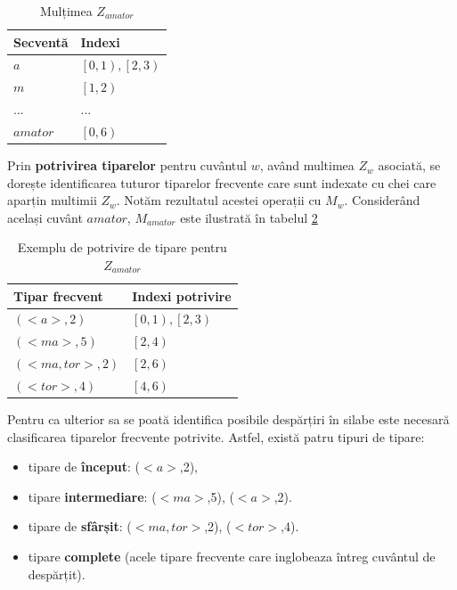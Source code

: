 \begin{table}[h!]
\centering    
\begin{tabular}{|l|l|}    
\hline      
Secventă & Indexi\\
\hline
$a$ 		& $\left[0,1\right), \left[2,3\right)$  \\
$m$ 		& $\left[1,2\right)$  \\
... 		& ...  \\
$amator$ 	& $\left[0,6\right)$  \\

\hline
\end{tabular}
\caption{Mulțimea $Z_{amator}$}
\label{table:sdb_substrings}               
\end{table}  

\begin{defi} Prin \textbf{potrivirea tiparelor} pentru cuvântul $w$, având multimea $Z_w$ asociată, se dorește identificarea tuturor tiparelor frecvente care sunt indexate cu chei care aparțin multimii $Z_w$. Notăm rezultatul acestei operații cu $M_w$. Considerând același cuvânt $amator$, $M_{amator}$ este ilustrată în tabelul \ref{table:sdb_pattern_match}
\end{defi}

\begin{table}[h!]
\centering    
\begin{tabular}{|l|l|}    
\hline      
Tipar frecvent & Indexi potrivire\\
\hline
$(<a>, 2)$			& $\left[0,1\right), \left[2,3\right)$   \\
$(<ma>, 5)$  		& $\left[2,4\right)$\\
$(<ma, tor>, 2)$ 	& $\left[2,6\right)$ \\
$(<tor>, 4)$  		& $\left[4,6\right)$\\
\hline
\end{tabular}
\caption{Exemplu de potrivire de tipare pentru $Z_{amator}$}
\label{table:sdb_pattern_match}               
\end{table}  

Pentru ca ulterior sa se poată identifica posibile despărțiri în silabe este necesară clasificarea tiparelor frecvente potrivite. Astfel, există patru tipuri de tipare:  

\begin{itemize}
\item tipare de \textbf{început}: ($<a>$,2),
\item tipare \textbf{intermediare}: ($<ma>$,5), ($<a>$,2).
\item tipare de \textbf{sfârșit}: ($<ma, tor>$,2), ($<tor>$,4).  
\item tipare \textbf{complete} (acele tipare frecvente care inglobeaza întreg cuvântul de despărțit).
\end{itemize}

